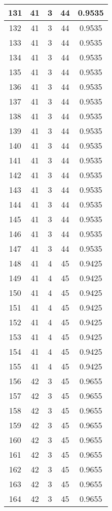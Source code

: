 \documentclass[letterpaper, 12pt]{article}
\begin{document}
\begin{longtable}{|c|c|c|c|c|}
\hline
131 & 41 & 3 & 44 & 0.9535 \\
\hline
132 & 41 & 3 & 44 & 0.9535 \\
\hline
133 & 41 & 3 & 44 & 0.9535 \\
\hline
134 & 41 & 3 & 44 & 0.9535 \\
\hline
135 & 41 & 3 & 44 & 0.9535 \\
\hline
136 & 41 & 3 & 44 & 0.9535 \\
\hline
137 & 41 & 3 & 44 & 0.9535 \\
\hline
138 & 41 & 3 & 44 & 0.9535 \\
\hline
139 & 41 & 3 & 44 & 0.9535 \\
\hline
140 & 41 & 3 & 44 & 0.9535 \\
\hline
141 & 41 & 3 & 44 & 0.9535 \\
\hline
142 & 41 & 3 & 44 & 0.9535 \\
\hline
143 & 41 & 3 & 44 & 0.9535 \\
\hline
144 & 41 & 3 & 44 & 0.9535 \\
\hline
145 & 41 & 3 & 44 & 0.9535 \\
\hline
146 & 41 & 3 & 44 & 0.9535 \\
\hline
147 & 41 & 3 & 44 & 0.9535 \\
\hline
148 & 41 & 4 & 45 & 0.9425 \\
\hline
149 & 41 & 4 & 45 & 0.9425 \\
\hline
150 & 41 & 4 & 45 & 0.9425 \\
\hline
151 & 41 & 4 & 45 & 0.9425 \\
\hline
152 & 41 & 4 & 45 & 0.9425 \\
\hline
153 & 41 & 4 & 45 & 0.9425 \\
\hline
154 & 41 & 4 & 45 & 0.9425 \\
\hline
155 & 41 & 4 & 45 & 0.9425 \\
\hline
156 & 42 & 3 & 45 & 0.9655 \\
\hline
157 & 42 & 3 & 45 & 0.9655 \\
\hline
158 & 42 & 3 & 45 & 0.9655 \\
\hline
159 & 42 & 3 & 45 & 0.9655 \\
\hline
160 & 42 & 3 & 45 & 0.9655 \\
\hline
161 & 42 & 3 & 45 & 0.9655 \\
\hline
162 & 42 & 3 & 45 & 0.9655 \\
\hline
163 & 42 & 3 & 45 & 0.9655 \\
\hline
164 & 42 & 3 & 45 & 0.9655 \\

\end{longtable}
\end{document}
